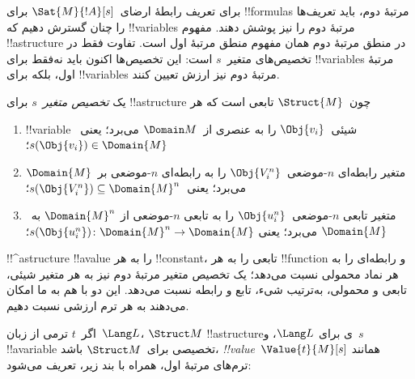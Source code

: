 \documentclass[../../../include/open-logic-section]{subfiles}
\begin{document}


\begin{explain}
برای تعریف رابطهٔ ارضای~$\Sat{M}{!A}[s]$ برای !!{formula}s مرتبهٔ دوم،
باید تعریف‌ها را چنان گسترش دهیم که !!{variable}s مرتبهٔ دوم را نیز
پوشش دهند. مفهوم !!a{structure} در منطق مرتبهٔ دوم همان مفهوم منطق
مرتبهٔ اول است. تفاوت فقط در تخصیص‌های متغیر~$s$ است: این تخصیص‌ها
اکنون باید نه‌فقط برای !!{variable}s مرتبهٔ اول، بلکه برای
!!{variable}s مرتبهٔ دوم نیز ارزش تعیین کنند.
\end{explain}

\begin{defn}
یک \emph{تخصیص متغیر}~$s$ برای !!a{structure} چون~$\Struct{M}$ تابعی
است که هر
\begin{enumerate}
\item !!{variable} شیئی~$\Obj{v_i}$ را به عنصری از~$\Domain M$ می‌برد؛
  یعنی~$s(\Obj{v_i}) \in \Domain{M}$؛
\item متغیر رابطه‌ای $n$-موضعی~$\Obj{V_i^n}$ را به رابطه‌ای $n$-موضعی
  بر~$\Domain{M}$ می‌برد؛ یعنی~$s(\Obj{V_i^n}) \subseteq \Domain{M}^n$؛
\item متغیر تابعی $n$-موضعی~$\Obj{u_i^n}$ را به تابعی $n$-موضعی از
  $\Domain{M}^n$ به~$\Domain{M}$ می‌برد؛ یعنی
  $s(\Obj{u_i^n})\colon \Domain{M}^n \to \Domain{M}$؛
\end{enumerate}
\end{defn}

\begin{explain}
!!^a{structure} !!a{value} را به هر !!{constant}، تابعی را به هر
!!{function} و رابطه‌ای را به هر نماد محمولی نسبت می‌دهد؛ یک تخصیص متغیر مرتبهٔ
دوم نیز به هر متغیر شیئی، تابعی و محمولی، به‌ترتیب شیء، تابع و رابطه
نسبت می‌دهد. این دو با هم به ما امکان می‌دهند به هر ترم ارزشی نسبت دهیم.
\end{explain}

\begin{defn}
اگر~$t$ ترمی از زبان~$\Lang L$، $\Struct M$ !!a{structure}ی برای
$\Lang L$، و~$s$ !!a{variable} تخصیصی برای~$\Struct M$ باشد،
\emph{!!{value}}~$\Value{t}{M}[s]$ همانند ترم‌های مرتبهٔ اول، همراه با
بند زیر، تعریف می‌شود:
\begin{quote}
\end{quote}
\end{defn}
\end{document}
